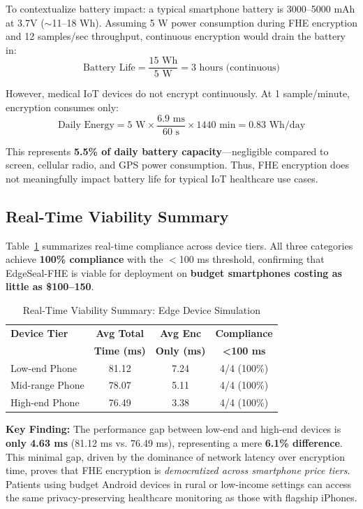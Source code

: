 \documentclass[review]{elsarticle}
\begin{document}
To contextualize battery impact: a typical smartphone battery is 3000--5000 mAh at 3.7V ($\sim$11--18 Wh). Assuming 5 W power consumption during FHE encryption and 12 samples/sec throughput, continuous encryption would drain the battery in:
\[
\text{Battery Life} = \frac{15 \text{ Wh}}{5 \text{ W}} = 3 \text{ hours (continuous)}
\]

However, medical IoT devices do not encrypt continuously. At 1 sample/minute, encryption consumes only:
\[
\text{Daily Energy} = 5 \text{ W} \times \frac{6.9 \text{ ms}}{60 \text{ s}} \times 1440 \text{ min} = 0.83 \text{ Wh/day}
\]

This represents \textbf{5.5\% of daily battery capacity}---negligible compared to screen, cellular radio, and GPS power consumption. Thus, FHE encryption does not meaningfully impact battery life for typical IoT healthcare use cases.

\subsection{Real-Time Viability Summary}

Table~\ref{tab:edge-viability-summary} summarizes real-time compliance across device tiers. All three categories achieve \textbf{100\% compliance} with the $<$100 ms threshold, confirming that EdgeSeal-FHE is viable for deployment on \textbf{budget smartphones costing as little as \$100--150}.

\begin{table}[!t]
\caption{Real-Time Viability Summary: Edge Device Simulation}
\label{tab:edge-viability-summary}
\centering
\begin{tabular}{|l|c|c|c|}
\hline
\textbf{Device Tier} & \textbf{Avg Total} & \textbf{Avg Enc} & \textbf{Compliance} \\
& \textbf{Time (ms)} & \textbf{Only (ms)} & \textbf{<100 ms} \\
\hline
Low-end Phone & 81.12 & 7.24 & 4/4 (100\%) \\
\hline
Mid-range Phone & 78.07 & 5.11 & 4/4 (100\%) \\
\hline
High-end Phone & 76.49 & 3.38 & 4/4 (100\%) \\
\hline
\end{tabular}
\end{table}

\textbf{Key Finding:} The performance gap between low-end and high-end devices is \textbf{only 4.63 ms} (81.12 ms vs. 76.49 ms), representing a mere \textbf{6.1\% difference}. This minimal gap, driven by the dominance of network latency over encryption time, proves that FHE encryption is \textit{democratized across smartphone price tiers}. Patients using budget Android devices in rural or low-income settings can access the same privacy-preserving healthcare monitoring as those with flagship iPhones.
\end{document}
